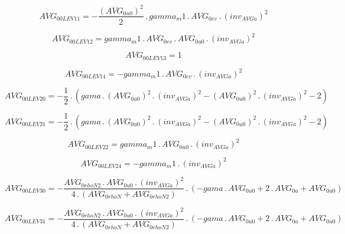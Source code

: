 \documentclass{article}
\begin{document}
\begin{dmath}AVG_{0 0 LEV 11} = - \frac{\left(AVG_{0 u0} \right)^{2}}{2} \,.\, gamma_m1 \,.\, AVG_{0 ev} \,.\, \left(inv_{AVG a} \right)^{2}\end{dmath}

\begin{dmath}AVG_{0 0 LEV 12} = gamma_m1 \,.\, AVG_{0 ev} \,.\, AVG_{0 u0} \,.\, \left(inv_{AVG a} \right)^{2}\end{dmath}

\begin{dmath}AVG_{0 0 LEV 13} = 1\end{dmath}

\begin{dmath}AVG_{0 0 LEV 14} = - gamma_m1 \,.\, AVG_{0 ev} \,.\, \left(inv_{AVG a} \right)^{2}\end{dmath}

\begin{dmath}AVG_{0 0 LEV 20} = - \frac{1}{2} \,.\, \left(gama \,.\, \left(AVG_{0 u0} \right)^{2} \,.\, \left(inv_{AVG a} \right)^{2} - \left(AVG_{0 u0} \right)^{2} \,.\, \left(inv_{AVG a} \right)^{2} - 2\right)\end{dmath}

\begin{dmath}AVG_{0 0 LEV 21} = - \frac{1}{2} \,.\, \left(gama \,.\, \left(AVG_{0 u0} \right)^{2} \,.\, \left(inv_{AVG a} \right)^{2} - \left(AVG_{0 u0} \right)^{2} \,.\, \left(inv_{AVG a} \right)^{2} - 2\right)\end{dmath}

\begin{dmath}AVG_{0 0 LEV 22} = gamma_m1 \,.\, AVG_{0 u0} \,.\, \left(inv_{AVG a} \right)^{2}\end{dmath}

\begin{dmath}AVG_{0 0 LEV 24} = - gamma_m1 \,.\, \left(inv_{AVG a} \right)^{2}\end{dmath}

\begin{dmath}AVG_{0 0 LEV 30} = - \frac{AVG_{0 rhoN2} \,.\, AVG_{0 u0} \,.\, \left(inv_{AVG a} \right)^{2}}{4 \,.\, \left(AVG_{0 rhoN} + AVG_{0 rhoN2}\right)} \,.\, \left(- gama \,.\, AVG_{0 u0} + 2 \,.\, AVG_{0 a} + AVG_{0 u0}\right)\end{dmath}

\begin{dmath}AVG_{0 0 LEV 31} = - \frac{AVG_{0 rhoN2} \,.\, AVG_{0 u0} \,.\, \left(inv_{AVG a} \right)^{2}}{4 \,.\, \left(AVG_{0 rhoN} + AVG_{0 rhoN2}\right)} \,.\, \left(- gama \,.\, AVG_{0 u0} + 2 \,.\, AVG_{0 a} + AVG_{0 u0}\right)\end{dmath}
\end{document}
